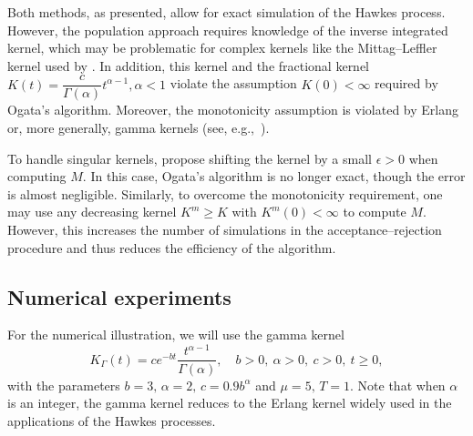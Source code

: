 \documentclass{article}
\newcommand{\1}{\mathbbm{1}}
\numberwithin{equation}{section}
\begin{document}
Both methods, as presented, allow for exact simulation of the Hawkes process. However, the population approach requires knowledge of the inverse integrated kernel, which may be problematic for complex kernels like the Mittag--Leffler kernel used by \citet*{Chen2021}. In addition, this kernel and the fractional kernel $K(t) = \dfrac{c}{\Gamma(\alpha)}t^{\alpha - 1}, \alpha < 1$ violate the assumption $K(0) < \infty$ required by Ogata's algorithm. Moreover, the monotonicity assumption is violated by Erlang or, more generally, gamma kernels (see, e.g.,~\citet{Duarte}).

To handle singular kernels, \citet{Chen2021} propose shifting the kernel by a small $\epsilon > 0$ when computing $M$. In this case, Ogata's algorithm is no longer exact, though the error is almost negligible. Similarly, to overcome the monotonicity requirement, one may use any decreasing kernel $K^m \geq K$ with $K^m(0) < \infty$ to compute $M$. However, this increases the number of simulations in the acceptance–rejection procedure and thus reduces the efficiency of the algorithm.

\subsection{Numerical experiments}
\label{subsec:numerical_experiments}
For the numerical illustration, we will use the gamma kernel
$$
K_{\Gamma}(t) = ce^{-b t}\dfrac{t^{\alpha - 1}}{\Gamma(\alpha)}, \quad b > 0, \ \alpha > 0, \ c > 0, \ t \geq 0,
$$
with the parameters $b = 3, \, \alpha = 2, \, c = 0.9b^\alpha$ and $\mu = 5,\, T = 1$. Note that when $\alpha$ is an integer, the gamma kernel reduces to the Erlang kernel widely used in the applications of the Hawkes processes.
\end{document}
